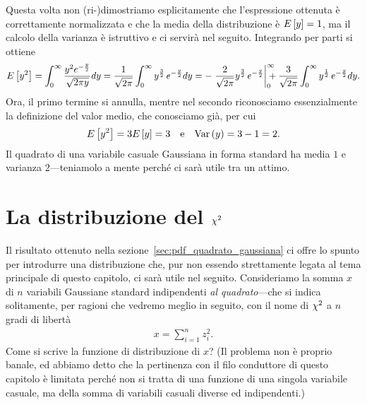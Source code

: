 
Questa volta non (ri-)dimostriamo esplicitamente che l'espressione ottenuta è
correttamente normalizzata e che la media della distribuzione è
$\displaystyle E\left[y\right] = 1$, ma il calcolo della varianza è istruttivo e ci servirà nel
seguito. Integrando per parti si ottiene
\begin{align*}
  \expect{y^2} = \int_0^\infty \frac{y^2 e^{-\frac{y}{2}}}{\sqrt{2\pi y}} dy =
  \frac{1}{\sqrt{2\pi}} \int_0^\infty y^\frac{3}{2}\, e^{-\frac{y}{2}} dy =
  -\eval{\frac{2}{\sqrt{2\pi}} y^\frac{3}{2}\, e^{-\frac{y}{2}}}{0}{\infty} +
  \frac{3}{\sqrt{2\pi}} \int_0^\infty y^\frac{1}{2}\, e^{-\frac{y}{2}} dy.
\end{align*}
Ora, il primo termine si annulla, mentre nel secondo riconosciamo essenzialmente
la definizione del valor medio, che conosciamo già, per cui
\begin{align}
  \displaystyle E\left[y^2\right] = 3 \displaystyle E\left[y\right] = 3 \quad \text{e} \quad \text{Var}\left(y\right) = 3 - 1 = 2.
\end{align}
Il quadrato di una variabile casuale Gaussiana in forma standard ha media $1$
e varianza $2$---teniamolo a mente perché ci sarà utile tra un attimo.


\section{La distribuzione del \texorpdfstring{$\chi^2$}{chi2}}
\label{sec:pdf_chi2}

Il risultato ottenuto nella sezione~\ref{sec:pdf_quadrato_gaussiana} ci offre
lo spunto per introdurre una distribuzione che, pur non essendo strettamente
legata al tema principale di questo capitolo, ci sarà utile nel seguito.
Consideriamo la somma $x$ di $n$ variabili Gaussiane standard indipendenti
\emph{al quadrato}---che si indica solitamente, per ragioni che vedremo meglio
in seguito, con il nome di $\chi^2$ a $n$ gradi di libertà
\begin{align}\label{eq:chi2}
  x = \sum_{i = 1}^n z_i^2.
\end{align}
Come si scrive la funzione di distribuzione di $x$? (Il problema non è proprio
banale, ed abbiamo detto che la pertinenza con il filo conduttore di questo
capitolo è limitata perché non si tratta di una funzione di una singola
variabile casuale, ma della somma di variabili casuali diverse ed indipendenti.)

